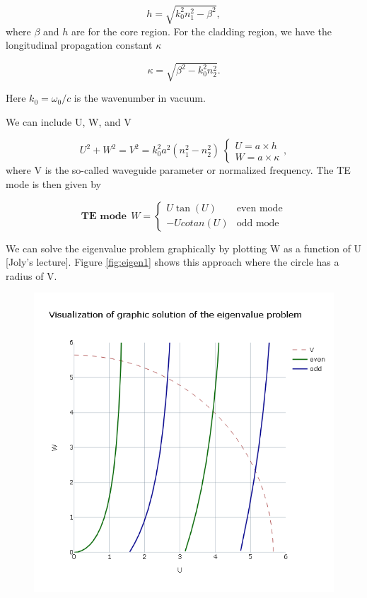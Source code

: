             \begin{equation}
                h=\sqrt{k_0^2n_1^2-\beta^2},
                \label{eq_h}
            \end{equation}
 where $\beta$ and $h$ are for the core region. For the cladding region, we have the longitudinal propagation constant $\kappa$

             \begin{equation}
                \kappa=\sqrt{\beta^2-k_0^2n_2^2}.
                \label{gam}
            \end{equation}
 
 Here $k_0 = \omega_0/c$ is the wavenumber in vacuum.

We can include U, W, and V

            \begin{equation}
                U^2+W^2 = V^2 = k_0^2a^2(n_1^2-n_2^2) \
                \begin{cases}
                    U = a \times h \\
                    W = a \times \kappa
                \end{cases} 
                \label{Normv},
            \end{equation}
where V is the so-called waveguide parameter or normalized frequency. 
The TE mode is then given by 
         
            
            \begin{equation}
            \textbf{TE mode} \ \ W=
                \begin{cases}
                    U \tan(U) & \text{even mode}\\
                    -U cotan(U) & \text{odd mode}
                \end{cases}
                \label{Temode}
            \end{equation}

We can solve the eigenvalue problem graphically by plotting W as a function of U [Joly's lecture]. Figure \ref{fig:eigen1} shows this approach where the circle has a radius of V.


\begin{figure}[label={fig:eigen1}, caption={Visualization of the graphic solution of the eigenvalue problem. Taken from \cite{herokuapp}}]
	\includegraphics[width=.6\textwidth]{figures/chap2/Eigenvalue.png} 
\end{figure}

